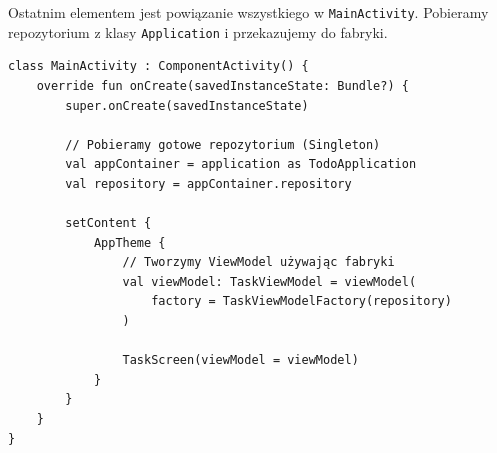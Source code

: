 Ostatnim elementem jest powiązanie wszystkiego w \texttt{MainActivity}. Pobieramy repozytorium z klasy \texttt{Application} i przekazujemy do fabryki.

\begin{verbatim}
class MainActivity : ComponentActivity() {
    override fun onCreate(savedInstanceState: Bundle?) {
        super.onCreate(savedInstanceState)
        
        // Pobieramy gotowe repozytorium (Singleton)
        val appContainer = application as TodoApplication
        val repository = appContainer.repository
        
        setContent {
            AppTheme {
                // Tworzymy ViewModel używając fabryki
                val viewModel: TaskViewModel = viewModel(
                    factory = TaskViewModelFactory(repository)
                )
                
                TaskScreen(viewModel = viewModel)
            }
        }
    }
}
\end{verbatim}
